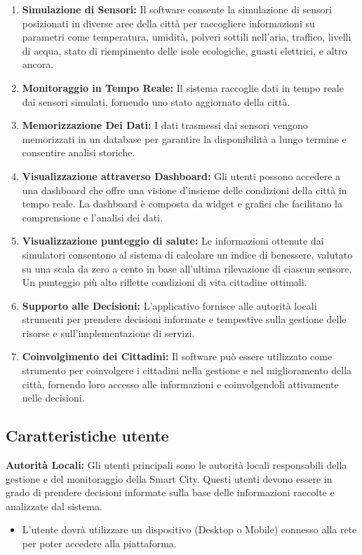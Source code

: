 \documentclass{article}
\begin{document}
\begin{enumerate}
    \item \textbf{Simulazione di Sensori:} Il software consente la simulazione di sensori posizionati in diverse aree della città per raccogliere informazioni su parametri come temperatura, umidità, polveri sottili nell’aria, traffico, livelli di acqua, stato di riempimento delle isole ecologiche, guasti elettrici, e altro ancora.

    \item \textbf{Monitoraggio in Tempo Reale:} Il sistema raccoglie dati in tempo reale dai sensori simulati, fornendo uno stato aggiornato della città.

    \item \textbf{Memorizzazione Dei Dati:} I dati trasmessi dai sensori vengono memorizzati in un database per garantire la disponibilità a lungo termine e consentire analisi storiche.

    \item \textbf{Visualizzazione attraverso Dashboard:} Gli utenti possono accedere a una dashboard che offre una visione d’insieme delle condizioni della città in tempo reale. La dashboard è composta da widget e grafici che facilitano la comprensione e l'analisi dei dati.

    \item \textbf{Visualizzazione punteggio di salute:} Le informazioni ottenute dai simulatori consentono al sistema di calcolare un indice di benessere, valutato su una scala da zero a cento in base all'ultima rilevazione di ciascun sensore. Un punteggio più alto riflette condizioni di vita cittadine ottimali.

    \item \textbf{Supporto alle Decisioni:} L'applicativo fornisce alle autorità locali strumenti per prendere decisioni informate e tempestive sulla gestione delle risorse e sull'implementazione di servizi.

    \item \textbf{Coinvolgimento dei Cittadini:} Il software può essere utilizzato come strumento per coinvolgere i cittadini nella gestione e nel miglioramento della città, fornendo loro accesso alle informazioni e coinvolgendoli attivamente nelle decisioni.

\end{enumerate}
\subsection{Caratteristiche utente}
\textbf{Autorità Locali:} Gli utenti principali sono le autorità locali responsabili della gestione e del monitoraggio della Smart City. Questi utenti devono essere in grado di prendere decisioni informate sulla base delle informazioni raccolte e analizzate dal sistema.
\begin{itemize}
    \item L'utente dovrà utilizzare un dispositivo (Desktop o Mobile) connesso alla rete per poter accedere alla piattaforma.
\end{itemize}
\end{document}
